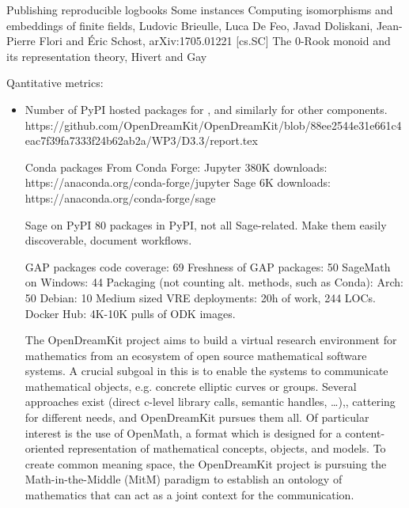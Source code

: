 \begin{Aim 1}
\begin{Aim 2}
Publishing reproducible logbooks %
    Some instances
    Computing isomorphisms and embeddings of finite fields, Ludovic Brieulle, Luca De Feo, Javad Doliskani, Jean-Pierre Flori and Éric 
    Schost, arXiv:1705.01221 [cs.SC] 
    The 0-Rook monoid and its representation theory, Hivert and Gay
     

Qantitative metrics:
    \begin{itemize}
    \item Number of PyPI hosted packages for \Sage, and similarly for other components.
     https://github.com/OpenDreamKit/OpenDreamKit/blob/88ee2544e31e661c4eac7f39fa7333f24b62ab2a/WP3/D3.3/report.tex
  
  Conda packages
      From Conda Forge:
      Jupyter 380K downloads: https://anaconda.org/conda-forge/jupyter
      Sage 6K downloads: https://anaconda.org/conda-forge/sage

      Sage on PyPI
      80 packages in PyPI, not all Sage-related.
      Make them easily discoverable, document workflows.


    GAP packages code coverage: 69%
    Freshness of GAP packages: 50%
    SageMath on Windows: 44%
    Packaging (not counting alt. methods, such as Conda):
    Arch: 50%
    Debian: 10%
    Medium sized VRE deployments: 20h of work, 244 LOCs.
    Docker Hub: 4K-10K pulls of ODK images.

The OpenDreamKit project aims to build a virtual research environment for mathematics from an ecosystem of open source mathematical software systems. A crucial subgoal in this is to enable the systems to communicate mathematical objects, e.g. concrete elliptic curves or groups.
Several approaches exist (direct c-level library calls, semantic handles, …),, cattering for different needs, and OpenDreamKit pursues them all. Of particular interest is the use of OpenMath, a format which is designed for a content-oriented representation of mathematical concepts, objects, and models. To create common meaning space, the OpenDreamKit project is pursuing the Math-in-the-Middle (MitM) paradigm to establish an ontology of mathematics that can act as a joint context for the communication.


\end{itemize}
\end{Aim 2}
\end{Aim 1}
